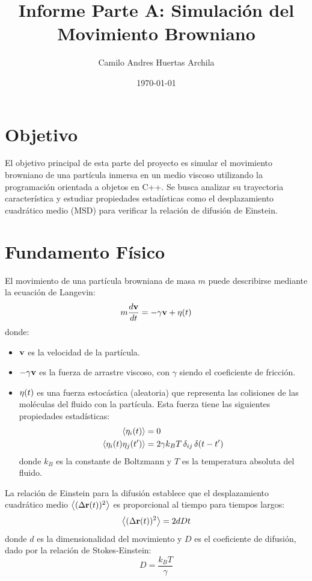 \documentclass[11pt,a4paper]{article}
\title{Informe Parte A: Simulación del Movimiento Browniano}
\author{Camilo Andres Huertas Archila}
\date{\today}
\begin{document}
\maketitle
\tableofcontents
\newpage

\section{Objetivo}
El objetivo principal de esta parte del proyecto es simular el movimiento browniano de una partícula inmersa en un medio viscoso utilizando la programación orientada a objetos en C++. Se busca analizar su trayectoria característica y estudiar propiedades estadísticas como el desplazamiento cuadrático medio (MSD) para verificar la relación de difusión de Einstein.

\section{Fundamento Físico}
El movimiento de una partícula browniana de masa $m$ puede describirse mediante la ecuación de Langevin:
\begin{equation}
    m\frac{d\vb{v}}{dt} = -\gamma\vb{v} + \vb{\eta}(t)
    \label{eq:langevin_informe}
\end{equation}
donde:
\begin{itemize}
    \item $\vb{v}$ es la velocidad de la partícula.
    \item $-\gamma\vb{v}$ es la fuerza de arrastre viscoso, con $\gamma$ siendo el coeficiente de fricción.
    \item $\vb{\eta}(t)$ es una fuerza estocástica (aleatoria) que representa las colisiones de las moléculas del fluido con la partícula. Esta fuerza tiene las siguientes propiedades estadísticas:
    \begin{align}
        \expval{\eta_i(t)} &= 0 \\
        \expval{\eta_i(t)\eta_j(t')} &= 2\gamma k_B T\,\delta_{ij}\,\delta(t-t')
        \label{eq:fuerza_estocastica_informe}
    \end{align}
    donde $k_B$ es la constante de Boltzmann y $T$ es la temperatura absoluta del fluido.
\end{itemize}
La relación de Einstein para la difusión establece que el desplazamiento cuadrático medio $\expval{(\Delta\vb{r}(t))^2}$ es proporcional al tiempo para tiempos largos:
\begin{equation}
    \expval{(\Delta\vb{r}(t))^2} = 2dDt
    \label{eq:difusion_einstein_informe}
\end{equation}
donde $d$ es la dimensionalidad del movimiento y $D$ es el coeficiente de difusión, dado por la relación de Stokes-Einstein:
\begin{equation}
    D = \frac{k_B T}{\gamma}
    \label{eq:stokes_einstein}
\end{equation}
\end{document}
